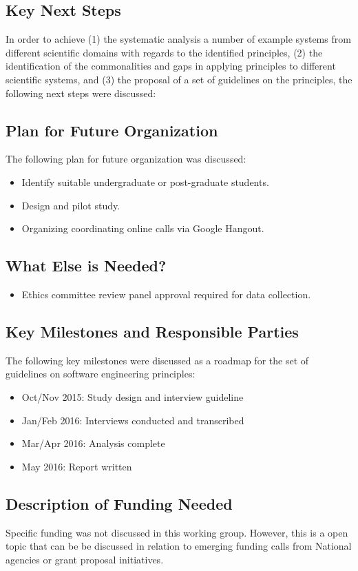 \subsection{Key Next Steps}
In order to achieve (1) the systematic analysis a number of example systems from different scientific domains with regards to the identified principles, (2) the identification of the commonalities and gaps in applying principles to different scientific systems, and (3) the proposal of a set of guidelines on the principles, the following next steps were discussed:

\subsection{Plan for Future Organization}
The following plan for future organization was discussed:
\begin{itemize}
\item Identify suitable undergraduate or post-graduate students.
\item Design and pilot study.
\item Organizing coordinating online calls via Google Hangout.
\end{itemize}

\subsection{What Else is Needed?}
\begin{itemize}
\item Ethics committee review panel approval required for data collection.
\end{itemize}

\subsection{Key Milestones and Responsible Parties}
The following key milestones were discussed as a roadmap for the set of guidelines on software engineering principles:
\begin{itemize}
\item Oct/Nov 2015: Study design and interview guideline
\item Jan/Feb 2016: Interviews conducted and transcribed
\item Mar/Apr 2016: Analysis complete
\item May 2016: Report written
\end{itemize}

\subsection{Description of Funding Needed}
Specific funding was not discussed in this working group. However, this is a open topic that can be be discussed in relation to emerging funding calls from National agencies or grant proposal initiatives.
